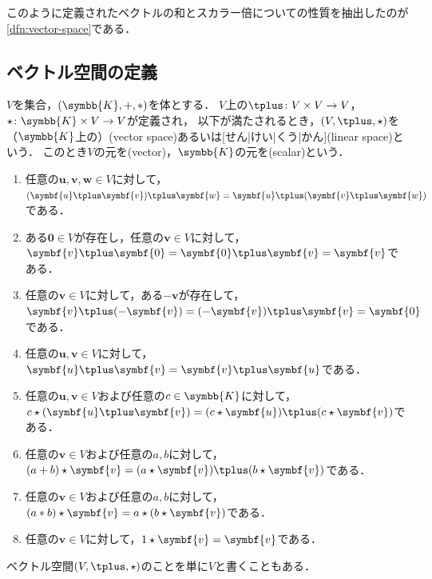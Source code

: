 \documentclass[../sotsu.tex]{subfiles}
\begin{document}
このように定義されたベクトルの和とスカラー倍についての性質を抽出したのが\cref{dfn:vector-space}である．



\subsection{ベクトル空間の定義}

\begin{definition}[ベクトル空間]
    \label{dfn:vector-space}
    $V$を集合，$(\symbb{K}, +, \dotprod)$を体とする．
    $V$上の$\vecplus\colon V \times V \to V$，$\scaprod \colon \symbb{K} \times V \to V$が定義され，
    以下が満たされるとき，$(V, \vecplus, \scaprod)$を（$\symbb{K}$上の）(vector space)あるいは[せん|けい|くう|かん](linear space)という．
    このとき$V$の元を(vector)，$\symbb{K}$の元を(scalar)という．
    \begin{enumerate}
        \item \label{vector:sum-associative} 任意の$\symbf{u}, \symbf{v}, \symbf{w} \in V$に対して，$(\symbf{u} \vecplus \symbf{v}) \vecplus \symbf{w} = \symbf{u} \vecplus (\symbf{v} \vecplus \symbf{w})$である．
        \item \label{vector:sum-zero} ある$\symbf{0} \in V$が存在し，任意の$\symbf{v} \in V$に対して，$\symbf{v} \vecplus \symbf{0} = \symbf{0} \vecplus \symbf{v} = \symbf{v}$である．
        \item \label{vector:sum-opposite} 任意の$\symbf{v} \in V$に対して，ある$-\symbf{v}$が存在して，$\symbf{v} \vecplus (-\symbf{v}) = (-\symbf{v}) \vecplus \symbf{v} = \symbf{0}$である．
        \item \label{vector:sum-commutative} 任意の$\symbf{u}, \symbf{v} \in V$に対して，$\symbf{u} \vecplus \symbf{v} = \symbf{v} \vecplus \symbf{u}$である．
        \item \label{vector:scalar-distributive} 任意の$\symbf{u}, \symbf{v} \in V$および任意の$c \in \symbb{K}$に対して，$c \scaprod (\symbf{u} \vecplus \symbf{v}) = (c \scaprod \symbf{u}) \vecplus (c \scaprod \symbf{v})$である．
        \item \label{vector:scalar-sum} 任意の$\symbf{v} \in V$および任意の$a, b$に対して，$(a + b) \scaprod \symbf{v} = (a \scaprod \symbf{v}) \vecplus (b \scaprod \symbf{v})$である．
        \item \label{vector:scalar-prod} 任意の$\symbf{v} \in V$および任意の$a, b$に対して，$(a \dotprod b) \scaprod \symbf{v} = a \scaprod (b \scaprod \symbf{v})$である．
        \item \label{vector:scalar-identity} 任意の$\symbf{v} \in V$に対して，$1 \scaprod \symbf{v} = \symbf{v}$である．
    \end{enumerate}
    ベクトル空間$(V, \vecplus, \scaprod)$のことを単に$V$と書くこともある．
\end{definition}
\end{document}
